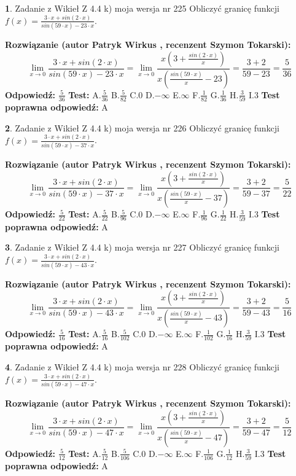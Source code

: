 \documentclass[12pt, a4paper]{article}
\theoremstyle{definition} %
\newtheorem{zad}{}
\newcommand{\zadStart}[1]{\begin{zad}#1\newline}
\newcommand{\zadStop}{\end{zad}}
\newcommand{\rozwStart}[2]{\noindent \textbf{Rozwiązanie (autor #1 , recenzent #2): }\newline}
\newcommand{\rozwStop}{\newline}
\newcommand{\odpStart}{\noindent \textbf{Odpowiedź:}\newline}
\newcommand{\odpStop}{\newline}
\newcommand{\testStart}{\noindent \textbf{Test:}\newline}
\newcommand{\testStop}{\newline}
\newcommand{\kluczStart}{\noindent \textbf{Test poprawna odpowiedź:}\newline}
\newcommand{\kluczStop}{\newline}
\begin{document}
\zadStart{Zadanie z Wikieł Z 4.4 k) moja wersja nr 225}
Obliczyć granicę funkcji $f(x)=\frac{3\cdot x +sin(2\cdot x)}{sin(59\cdot x) -23\cdot x}$.
\zadStop
\rozwStart{Patryk Wirkus}{Szymon Tokarski}
$$\lim\limits_{x\to 0}\frac{3\cdot x +sin(2\cdot x)}{sin(59\cdot x) -23\cdot x}
=\lim\limits_{x\to 0}\frac{x(3+\frac{sin(2\cdot x)}{x})}{x(\frac{sin(59\cdot x)}{x}-23)}
=\frac{3+2}{59-23} = \frac{5}{36}$$
\rozwStop
\odpStart
$\frac{5}{36}$
\odpStop
\testStart
A.$\frac{5}{36}$
B.$\frac{5}{82}$
C.$0$
D.$-\infty$
E.$\infty$
F.$\frac{1}{82}$
G.$\frac{1}{36}$
H.$\frac{3}{59}$
I.$3$
\testStop
\kluczStart
A
\kluczStop



\zadStart{Zadanie z Wikieł Z 4.4 k) moja wersja nr 226}
Obliczyć granicę funkcji $f(x)=\frac{3\cdot x +sin(2\cdot x)}{sin(59\cdot x) -37\cdot x}$.
\zadStop
\rozwStart{Patryk Wirkus}{Szymon Tokarski}
$$\lim\limits_{x\to 0}\frac{3\cdot x +sin(2\cdot x)}{sin(59\cdot x) -37\cdot x}
=\lim\limits_{x\to 0}\frac{x(3+\frac{sin(2\cdot x)}{x})}{x(\frac{sin(59\cdot x)}{x}-37)}
=\frac{3+2}{59-37} = \frac{5}{22}$$
\rozwStop
\odpStart
$\frac{5}{22}$
\odpStop
\testStart
A.$\frac{5}{22}$
B.$\frac{5}{96}$
C.$0$
D.$-\infty$
E.$\infty$
F.$\frac{1}{96}$
G.$\frac{1}{22}$
H.$\frac{3}{59}$
I.$3$
\testStop
\kluczStart
A
\kluczStop



\zadStart{Zadanie z Wikieł Z 4.4 k) moja wersja nr 227}
Obliczyć granicę funkcji $f(x)=\frac{3\cdot x +sin(2\cdot x)}{sin(59\cdot x) -43\cdot x}$.
\zadStop
\rozwStart{Patryk Wirkus}{Szymon Tokarski}
$$\lim\limits_{x\to 0}\frac{3\cdot x +sin(2\cdot x)}{sin(59\cdot x) -43\cdot x}
=\lim\limits_{x\to 0}\frac{x(3+\frac{sin(2\cdot x)}{x})}{x(\frac{sin(59\cdot x)}{x}-43)}
=\frac{3+2}{59-43} = \frac{5}{16}$$
\rozwStop
\odpStart
$\frac{5}{16}$
\odpStop
\testStart
A.$\frac{5}{16}$
B.$\frac{5}{102}$
C.$0$
D.$-\infty$
E.$\infty$
F.$\frac{1}{102}$
G.$\frac{1}{16}$
H.$\frac{3}{59}$
I.$3$
\testStop
\kluczStart
A
\kluczStop



\zadStart{Zadanie z Wikieł Z 4.4 k) moja wersja nr 228}
Obliczyć granicę funkcji $f(x)=\frac{3\cdot x +sin(2\cdot x)}{sin(59\cdot x) -47\cdot x}$.
\zadStop
\rozwStart{Patryk Wirkus}{Szymon Tokarski}
$$\lim\limits_{x\to 0}\frac{3\cdot x +sin(2\cdot x)}{sin(59\cdot x) -47\cdot x}
=\lim\limits_{x\to 0}\frac{x(3+\frac{sin(2\cdot x)}{x})}{x(\frac{sin(59\cdot x)}{x}-47)}
=\frac{3+2}{59-47} = \frac{5}{12}$$
\rozwStop
\odpStart
$\frac{5}{12}$
\odpStop
\testStart
A.$\frac{5}{12}$
B.$\frac{5}{106}$
C.$0$
D.$-\infty$
E.$\infty$
F.$\frac{1}{106}$
G.$\frac{1}{12}$
H.$\frac{3}{59}$
I.$3$
\testStop
\kluczStart
A
\kluczStop
\end{document}
